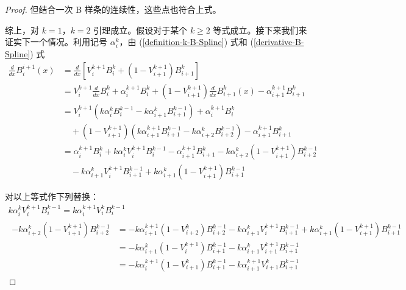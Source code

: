 \documentclass[a4paper]{article}
\begin{document}
\begin{proof}[Proof]
        \noindent 但结合一次 B 样条的连续性，这些点也符合上式。
        
        综上，对 $k = 1$，$k = 2$ 引理成立。假设对于某个 $k \geqslant 2$ 等式成立。接下来我们来证实下一个情况。利用记号 $\alpha_i^k$，由 (\ref{definition-k-B-Spline}) 式和 (\ref{derivative-B-Spline}) 式
        \begin{align*}
        \frac{d}{dx} B_{i}^{i+1}(x) & = 
            \frac{d}{dx} \left[ V_{i}^{k+1} B_{i}^{k} + (1 - V_{i+1}^{k+1}) B_{i+1}^{k} \right] \\
            & = V_{i}^{k+1} \frac{d}{dx} B_{i}^{k} + \alpha_{i}^{k+1} B_{i}^{k} + (1 - V_{i+1}^{k+1}) \frac{d}{dx} B_{i+1}^{k}(x) - \alpha_{i+1}^{k+1} B_{i+1}^{k} \\
            & = V_{i}^{k+1} \left( k \alpha_{i}^{k} B_{i}^{k-1} - k \alpha_{i+1}^{k} B_{i+1}^{k-1} \right) + \alpha_{i}^{k+1} B_{i}^{k} \\
            & \quad + (1 - V_{i+1}^{k+1}) \left( k \alpha_{i+1}^{k+1} B_{i+1}^{k-1} - k \alpha_{i+2}^{k} B_{i+2}^{k-1} \right) - \alpha_{i+1}^{k+1} B_{i+1}^{k} \\
            & = \alpha_{i}^{k+1} B_{i}^{k} + k \alpha_{i}^{k} V_{i}^{k+1} B_{i}^{k-1} - \alpha_{i+1}^{k+1} B_{i+1}^{k} - k \alpha_{i+2}^{k} (1 - V_{i+1}^{k+1}) B_{i+2}^{k-1} \\
            & \quad - k \alpha_{i+1}^{k} V_{i}^{k+1} B_{i+1}^{k-1} + k \alpha_{i+1}^{k} (1 - V_{i+1}^{k+1}) B_{i+1}^{k-1}
        \end{align*}

        \noindent 对以上等式作下列替换：
        \begin{gather*}
            k \alpha_{i}^{k} V_{i}^{k+1} B_{i}^{k-1} = k \alpha_{i}^{k+1} V_{i}^{k} B_{i}^{k-1} \\
            \begin{aligned}
                - k \alpha_{i+2}^{k} (1 - V_{i+1}^{k+1}) B_{i+2}^{k-1} & = - k \alpha_{i+1}^{k+1} (1 - V_{i+2}^{k}) B_{i+2}^{k-1} - k \alpha_{i+1}^{k} V_{i}^{k+1} B_{i+1}^{k-1} + k \alpha_{i+1}^{k} (1 - V_{i+1}^{k+1}) B_{i+1}^{k-1} \\
                & = - k \alpha_{i+1}^{k} (1 - V_{i}^{k+1}) B_{i+1}^{k-1} - k \alpha_{i+1}^{k} V_{i+1}^{k+1} B_{i+1}^{k-1} \\
                & = - k \alpha_{i}^{k+1} (1 - V_{i+1}^{k}) B_{i+1}^{k-1} - k \alpha_{i+1}^{k+1} V_{i+1}^{k} B_{i+1}^{k-1}
            \end{aligned}
        \end{gather*}


\end{proof}
\end{document}
